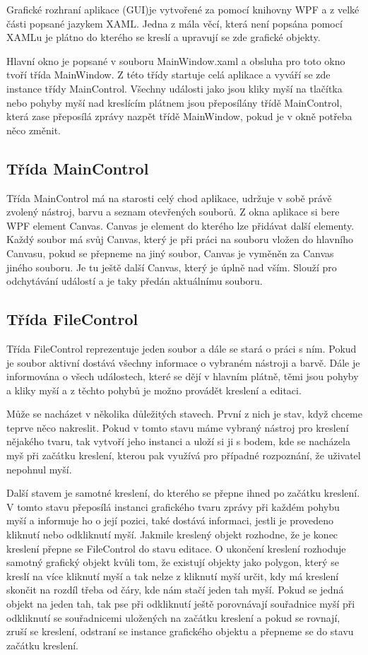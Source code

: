 \documentclass[
  field=inf,
  biblatex,
  glossaries,
  index
]{kidiplom}
\begin{document}
Grafické rozhraní aplikace (GUI)je vytvořené za pomocí knihovny WPF a z velké části popsané jazykem XAML. Jedna z mála věcí, která není popsána pomocí XAMLu je plátno do kterého se kreslí a upravují se zde grafické objekty.

Hlavní okno je popsané v souboru MainWindow.xaml a obsluha pro toto okno tvoří třída MainWindow. Z této třídy startuje celá aplikace a vyváří se zde instance třídy MainControl. Všechny události jako jsou kliky myší na tlačítka nebo pohyby myší nad kreslícím plátnem jsou přeposílány třídě MainControl, která zase přeposílá zprávy nazpět třídě MainWindow, pokud je v okně potřeba něco změnit.

\subsection{Třída MainControl}

Třída MainControl má na starosti celý chod aplikace, udržuje v sobě právě zvolený nástroj, barvu a seznam otevřených souborů. Z okna aplikace si bere WPF element Canvas. Canvas je element do kterého lze přidávat další elementy. Každý soubor má svůj  Canvas, který je při práci na souboru vložen do hlavního Canvasu, pokud se přepneme na jiný soubor, Canvas je vyměněn za Canvas jiného souboru. Je tu ještě další Canvas, který je úplně nad vším. Slouží pro odchytávání událostí a je taky předán aktuálnímu souboru.

\subsection{Třída FileControl}

Třída FileControl reprezentuje jeden soubor a dále se stará o práci s ním. Pokud je soubor aktivní dostává všechny informace o vybraném nástroji a barvě. Dále je informována o všech událostech, které se dějí v hlavním plátně, těmi jsou pohyby a kliky myší a z těchto pohybů je možno provádět kreslení a editaci.

Může se nacházet v několika důležitých stavech. První z nich je stav, když chceme teprve něco nakreslit. Pokud v tomto stavu máme vybraný nástroj pro kreslení nějakého tvaru, tak vytvoří jeho instanci a uloží si ji s bodem, kde se nacházela myš při začátku kreslení, kterou pak využívá pro případné rozpoznání, že uživatel nepohnul myší. 

Další stavem je samotné kreslení, do kterého se přepne ihned po začátku kreslení. V tomto stavu přeposílá instanci grafického tvaru zprávy při každém pohybu myší a informuje ho o její pozici, také dostává informaci, jestli je provedeno kliknutí nebo odkliknutí myší. Jakmile kreslený objekt rozhodne, že je konec kreslení přepne se FileControl do stavu editace. O ukončení kreslení rozhoduje samotný grafický objekt kvůli tom, že existují objekty jako polygon, který se kreslí na více kliknutí myší a tak nelze z kliknutí myší určit, kdy má kreslení skončit na rozdíl třeba od čáry, kde nám stačí jeden tah myší. Pokud se jedná objekt na jeden tah, tak pse při odkliknutí ještě porovnávají souřadnice myší při odkliknutí se souřadnicemi uložených na začátku kreslení a pokud se rovnají, zruší se kreslení, odstraní se instance grafického objektu a přepneme se do stavu začátku kreslení.
\end{document}
